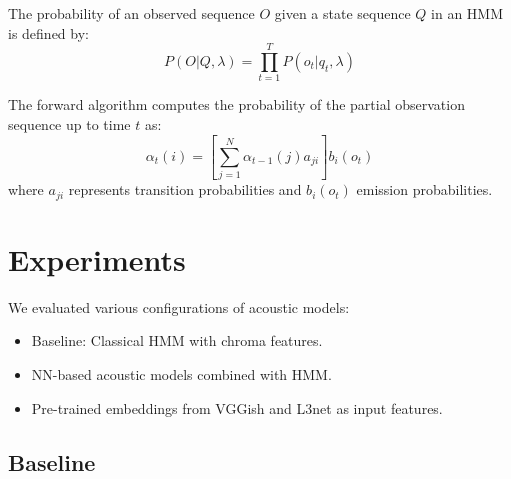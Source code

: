 \documentclass{article}
\begin{document}
The probability of an observed sequence $O$ given a state sequence $Q$ in an HMM is defined by:
\begin{equation}
P(O|Q,\lambda) = \prod_{t=1}^{T} P(o_t|q_t,\lambda)
\end{equation}

The forward algorithm computes the probability of the partial observation sequence up to time $t$ as:
\begin{equation}
\alpha_t(i) = \left[\sum_{j=1}^{N}\alpha_{t-1}(j)a_{ji}\right] b_i(o_t)
\end{equation}
where $a_{ji}$ represents transition probabilities and $b_i(o_t)$ emission probabilities.

\section{Experiments}
We evaluated various configurations of acoustic models:
\begin{itemize}
    \item Baseline: Classical HMM with chroma features.
    \item NN-based acoustic models combined with HMM.
    \item Pre-trained embeddings from VGGish and L3net as input features.
\end{itemize}

\subsection{Baseline}
\end{document}
